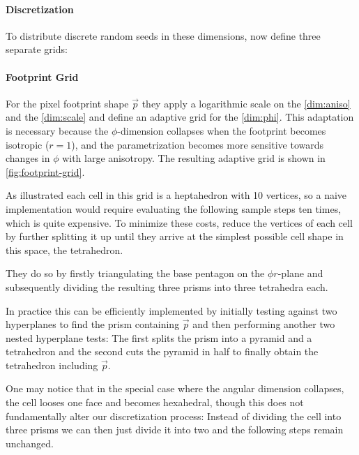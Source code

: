\paragraph{Discretization}
%
To distribute discrete random seeds in these dimensions, \textcite{deliot2023} now define three separate grids:


\paragraph{Footprint Grid}
\label{sec:footprint-grid}
%
For the pixel footprint shape $\vec{p}$ they apply a logarithmic scale on the \ref{dim:aniso} and the \ref{dim:scale} and define an adaptive grid for the \ref{dim:phi}.
%
This adaptation is necessary because the $\phi$-dimension collapses when the footprint becomes isotropic ($r=1$), and the parametrization becomes more sensitive towards changes in $\phi$ with large anisotropy.
%
The resulting adaptive grid is shown in \cref{fig:footprint-grid}.



As illustrated each cell in this grid is a heptahedron with 10 vertices, so a naive implementation would require evaluating the following sample steps ten times, which is quite expensive.
%
To minimize these costs, \textcite{deliot2023} reduce the vertices of each cell by further splitting it up until they arrive at the simplest possible cell shape in this space, the tetrahedron.


They do so by firstly triangulating the base pentagon on the $\phi r$\nobreakdash-plane and subsequently dividing the resulting three prisms into three tetrahedra each.


In practice this can be efficiently implemented by initially testing against two hyperplanes to find the prism containing $\vec{p}$ and then performing another two nested hyperplane tests:
%
The first splits the prism into a pyramid and a tetrahedron and the second cuts the pyramid in half to finally obtain the tetrahedron including $\vec{p}$.


One may notice that in the special case where the angular dimension collapses, the cell looses one face and becomes hexahedral, though this does not fundamentally alter our discretization process:
%
Instead of dividing the cell into three prisms we can then just divide it into two and the following steps remain unchanged.




